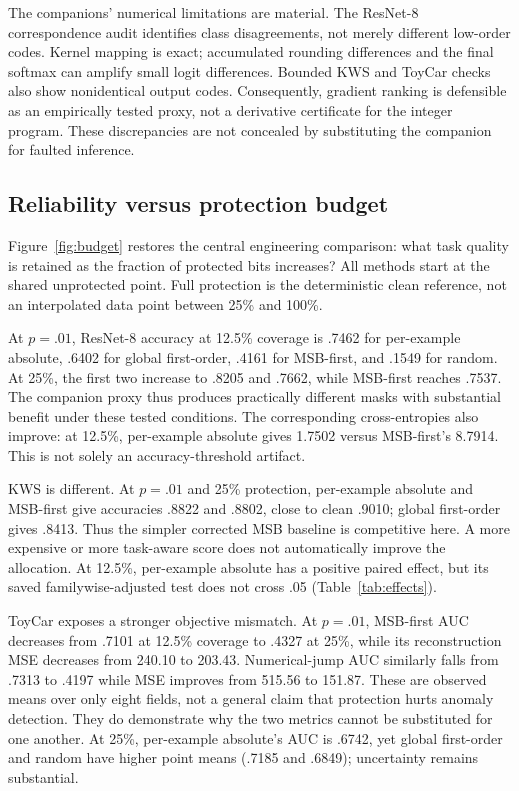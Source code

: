 The companions' numerical limitations are material. The ResNet-8 correspondence
audit identifies class disagreements, not merely different low-order codes.
Kernel mapping is exact; accumulated rounding differences and the final
softmax can amplify small logit differences. Bounded KWS and ToyCar checks also
show nonidentical output codes. Consequently, gradient ranking is defensible as
an empirically tested proxy, not a derivative certificate for the integer program.
These discrepancies are not concealed by substituting the companion for faulted
inference.

\subsection{Reliability versus protection budget}
Figure~\ref{fig:budget} restores the central engineering comparison: what task
quality is retained as the fraction of protected bits increases? All methods
start at the shared unprotected point. Full protection is the deterministic clean
reference, not an interpolated data point between 25\% and 100\%.

At $p=.01$, ResNet-8 accuracy at 12.5\% coverage is .7462 for per-example absolute,
.6402 for global first-order, .4161 for MSB-first, and .1549 for random. At 25\%,
the first two increase to .8205 and .7662, while MSB-first reaches .7537. The
companion proxy thus produces practically different masks with substantial
benefit under these tested conditions. The corresponding cross-entropies also
improve: at 12.5\%, per-example absolute gives 1.7502 versus MSB-first's 8.7914.
This is not solely an accuracy-threshold artifact.

KWS is different. At $p=.01$ and 25\% protection, per-example absolute and
MSB-first give accuracies .8822 and .8802, close to clean .9010; global first-order
gives .8413. Thus the simpler corrected MSB baseline is competitive here. A
more expensive or more task-aware score does not automatically improve the
allocation. At 12.5\%, per-example absolute has a positive paired effect, but
its saved familywise-adjusted test does not cross .05 (Table~\ref{tab:effects}).

ToyCar exposes a stronger objective mismatch. At $p=.01$, MSB-first AUC decreases
from .7101 at 12.5\% coverage to .4327 at 25\%, while its reconstruction MSE
decreases from 240.10 to 203.43. Numerical-jump AUC similarly falls from .7313
to .4197 while MSE improves from 515.56 to 151.87. These are observed means over
only eight fields, not a general claim that protection hurts anomaly detection.
They do demonstrate why the two metrics cannot be substituted for one another.
At 25\%, per-example absolute's AUC is .6742, yet global first-order and random
have higher point means (.7185 and .6849); uncertainty remains substantial.

